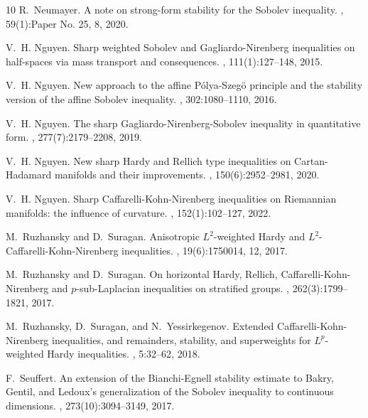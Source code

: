 \documentclass[a4paper,12pt]{article}
\theoremstyle{plain}
\theoremstyle{definition}
\theoremstyle{remark}
\numberwithin{equation}{section}
\begin{document}
\begin{thebibliography}{10}
R.~Neumayer.
\newblock A note on strong-form stability for the {S}obolev inequality.
, 59(1):Paper No. 25,
  8, 2020.

V.~H. Nguyen.
\newblock Sharp weighted {S}obolev and {G}agliardo-{N}irenberg inequalities on
  half-spaces via mass transport and consequences.
, 111(1):127--148, 2015.

V.~H. Nguyen.
\newblock New approach to the affine {P}\'olya-{S}zeg\"o{} principle and the
  stability version of the affine {S}obolev inequality.
, 302:1080--1110, 2016.

V.~H. Nguyen.
\newblock The sharp {G}agliardo-{N}irenberg-{S}obolev inequality in
  quantitative form.
, 277(7):2179--2208, 2019.

V.~H. Nguyen.
\newblock New sharp {H}ardy and {R}ellich type inequalities on
  {C}artan-{H}adamard manifolds and their improvements.
, 150(6):2952--2981, 2020.

V.~H. Nguyen.
\newblock Sharp {C}affarelli-{K}ohn-{N}irenberg inequalities on {R}iemannian
  manifolds: the influence of curvature.
, 152(1):102--127, 2022.

M.~Ruzhansky and D.~Suragan.
\newblock Anisotropic {$L^2$}-weighted {H}ardy and
  {$L^2$}-{C}affarelli-{K}ohn-{N}irenberg inequalities.
, 19(6):1750014, 12, 2017.

M.~Ruzhansky and D.~Suragan.
\newblock On horizontal {H}ardy, {R}ellich, {C}affarelli-{K}ohn-{N}irenberg and
  {$p$}-sub-{L}aplacian inequalities on stratified groups.
, 262(3):1799--1821, 2017.

M.~Ruzhansky, D.~Suragan, and N.~Yessirkegenov.
\newblock Extended {C}affarelli-{K}ohn-{N}irenberg inequalities, and
  remainders, stability, and superweights for {$L^p$}-weighted {H}ardy
  inequalities.
, 5:32--62, 2018.

F.~Seuffert.
\newblock An extension of the {B}ianchi-{E}gnell stability estimate to {B}akry,
  {G}entil, and {L}edoux's generalization of the {S}obolev inequality to
  continuous dimensions.
, 273(10):3094--3149, 2017.


\end{thebibliography}
\end{document}
